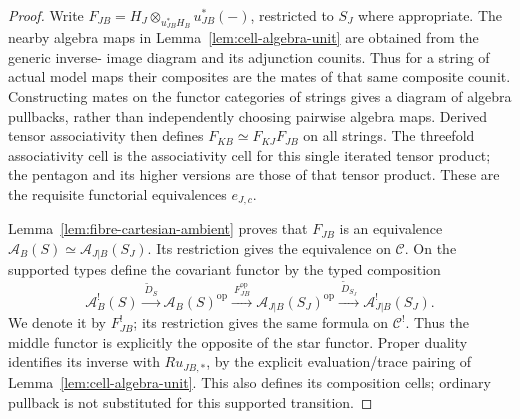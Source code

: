 \documentclass[11pt]{article}
\theoremstyle{definition}
\theoremstyle{remark}
\begin{document}
\begin{proof}
Write $F_{JB}=H_J\otimes_{u_{JB}^*H_B}u_{JB}^*(-)$, restricted to
$S_J$ where appropriate.  The nearby algebra maps in
Lemma~\ref{lem:cell-algebra-unit} are obtained from the generic inverse-
image diagram and its adjunction counits.  Thus for a string of actual
model maps their composites are the mates of that same composite
counit.  Constructing mates on the functor categories of strings gives
a diagram of algebra pullbacks, rather than independently choosing
pairwise algebra maps.  Derived tensor associativity then defines
$F_{KB}\simeq F_{KJ}F_{JB}$ on all strings.  The threefold associativity
cell is the associativity cell for this single iterated tensor product;
the pentagon and its higher versions are those of that tensor product.
These are the requisite functorial equivalences $e_{J,c}$.

Lemma~\ref{lem:fibre-cartesian-ambient} proves that $F_{JB}$ is an
equivalence $\mathcal A_B(S)\simeq\mathcal A_{J|B}(S_J)$.
Its restriction gives the equivalence on $\mathcal C$.
On the supported types define the covariant functor by the typed
composition
\[
 \mathcal A_B^!(S)
 \xrightarrow{\ \widetilde D_S\ }\mathcal A_B(S)^{\mathrm{op}}
 \xrightarrow{\ F_{JB}^{\mathrm{op}}\ }
                  \mathcal A_{J|B}(S_J)^{\mathrm{op}}
 \xrightarrow{\ \widetilde D_{S_J}\ }\mathcal A_{J|B}^!(S_J).
\]
We denote it by $F_{JB}^{!}$; its restriction gives the same formula
on $\mathcal C^!$.  Thus the middle functor is explicitly the opposite
of the star functor.  Proper duality identifies its inverse with $Ru_{JB,*}$,
by the explicit evaluation/trace pairing of
Lemma~\ref{lem:cell-algebra-unit}.  This also defines its composition
cells; ordinary pullback is not substituted for this supported transition.


\end{proof}
\end{document}
